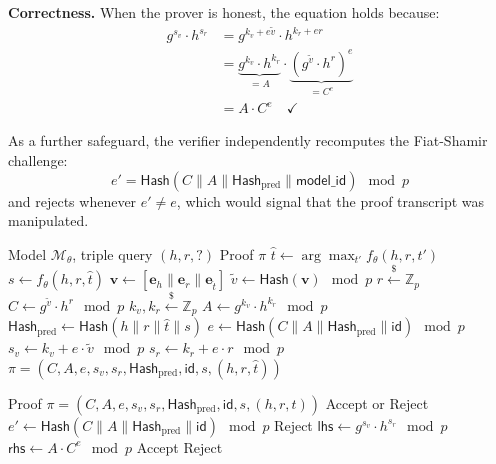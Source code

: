 \documentclass[conference, 10pt]{IEEEtran}
\newcommand{\Z}{\mathbb{Z}}
\newcommand{\Hash}{\mathsf{Hash}}
\newcommand{\embed}{\mathbf{e}}
\newcommand{\vect}[1]{\mathbf{#1}}
\begin{document}
\textbf{Correctness.} When the prover is honest, the equation holds because:
\begin{align}
    g^{s_v} \cdot h^{s_r} &= g^{k_v + e\tilde{v}} \cdot h^{k_r + er} \nonumber \\
    &= \underbrace{g^{k_v} \cdot h^{k_r}}_{= A} \cdot \underbrace{(g^{\tilde{v}} \cdot h^r)^e}_{= C^e} \nonumber \\
    &= A \cdot C^e \quad \checkmark
    \label{eq:correctness}
\end{align}

As a further safeguard, the verifier independently recomputes the Fiat-Shamir challenge:
\begin{equation}
    e' = \Hash(C \| A \| \Hash_{\text{pred}} \| \mathsf{model\_id}) \mod p
    \label{eq:challenge_verify}
\end{equation}
and rejects whenever $e' \neq e$, which would signal that the proof transcript was manipulated.

\begin{algorithm}[t]
\caption{ZK-KGVerify Proof Generation}
\label{alg:proof_gen}
\begin{algorithmic}[1]
\REQUIRE Model $\mathcal{M}_\theta$, triple query $(h, r, ?)$
\ENSURE Proof $\pi$
\STATE {}
\STATE $\hat{t} \leftarrow \arg\max_{t'} f_\theta(h, r, t')$
\STATE $s \leftarrow f_\theta(h, r, \hat{t})$
\STATE $\vect{v} \leftarrow [\embed_h \| \embed_r \| \embed_{\hat{t}}]$
\STATE {}
\STATE $\tilde{v} \leftarrow \Hash(\vect{v}) \mod p$
\STATE $r \xleftarrow{\$} \Z_p$
\STATE $C \leftarrow g^{\tilde{v}} \cdot h^r \mod p$
\STATE {}
\STATE $k_v, k_r \xleftarrow{\$} \Z_p$
\STATE $A \leftarrow g^{k_v} \cdot h^{k_r} \mod p$
\STATE $\Hash_{\text{pred}} \leftarrow \Hash(h \| r \| \hat{t} \| s)$
\STATE $e \leftarrow \Hash(C \| A \| \Hash_{\text{pred}} \| \mathsf{id}) \mod p$
\STATE $s_v \leftarrow k_v + e \cdot \tilde{v} \mod p$
\STATE $s_r \leftarrow k_r + e \cdot r \mod p$
\RETURN $\pi = (C, A, e, s_v, s_r, \Hash_{\text{pred}}, \mathsf{id}, s, (h,r,\hat{t}))$
\end{algorithmic}
\end{algorithm}

\begin{algorithm}[t]
\caption{ZK-KGVerify Proof Verification}
\label{alg:proof_verify}
\begin{algorithmic}[1]
\REQUIRE Proof $\pi = (C, A, e, s_v, s_r, \Hash_{\text{pred}}, \mathsf{id}, s, (h,r,t))$
\ENSURE Accept or Reject
\STATE {}
\STATE $e' \leftarrow \Hash(C \| A \| \Hash_{\text{pred}} \| \mathsf{id}) \mod p$
    \RETURN Reject 
\ENDIF
\STATE {}
\STATE $\mathsf{lhs} \leftarrow g^{s_v} \cdot h^{s_r} \mod p$
\STATE $\mathsf{rhs} \leftarrow A \cdot C^e \mod p$
    \RETURN Accept 
\ELSE
    \RETURN Reject
\ENDIF
\end{algorithmic}
\end{algorithm}
\end{document}
